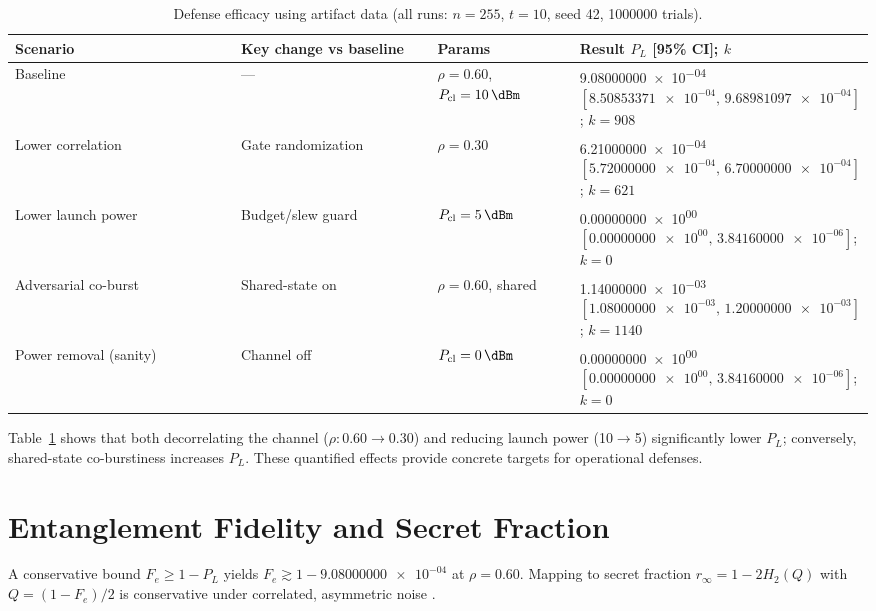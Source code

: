 \documentclass{article}
\newcommand{\val}[1]{\num[round-mode=figures,round-precision=3]{#1}}
\newcommand{\simpcl}{10}
\newcommand{\simn}{255}
\newcommand{\simt}{10}
\newcommand{\simtrials}{1000000}
\newcommand{\simseed}{42}
\newcommand{\simrhoB}{0.60}
\newcommand{\simpLB}{9.08000000e-04}
\newcommand{\simpLBlo}{8.50853371e-04}
\newcommand{\simpLBhi}{9.68981097e-04}
\newcommand{\simkB}{908}
\newcommand{\simrhoA}{0.30}
\newcommand{\simpLA}{6.21000000e-04}
\newcommand{\simpLAlo}{5.72000000e-04}
\newcommand{\simpLAhi}{6.70000000e-04}
\newcommand{\simkA}{621}
\newcommand{\simpclA}{0}
\newcommand{\simpLPclA}{0.00000000e+00}
\newcommand{\simpLPclAlo}{0.00000000e+00}
\newcommand{\simpLPclAhi}{3.84160000e-06}
\newcommand{\simkPclA}{0}
\newcommand{\simpclB}{5}
\newcommand{\simpLPclB}{0.00000000e+00}
\newcommand{\simpLPclBlo}{0.00000000e+00}
\newcommand{\simpLPclBhi}{3.84160000e-06}
\newcommand{\simkPclB}{0}
\newcommand{\simSharedPL}{1.14000000e-03}
\newcommand{\simSharedPLlo}{1.08000000e-03}
\newcommand{\simSharedPLhi}{1.20000000e-03}
\newcommand{\simSharedk}{1140}
\begin{document}
\begin{table}[ht]
\small
\centering
\caption{Defense efficacy using artifact data (all runs: \(n=\simn\), \(t=\simt\), seed \simseed, \simtrials{} trials).}
\label{tab:defense-efficacy}
\begin{adjustbox}{width=\linewidth}
\begin{tabular}{p{0.31\linewidth} p{0.26\linewidth} p{0.18\linewidth} p{0.25\linewidth}}
\toprule
Scenario & Key change vs baseline & Params & Result \(P_L\) [95\% CI]; \(k\) \\
\midrule
Baseline & --- & \(\rho=\simrhoB\), \(P_{\mathrm{cl}}=\SI{\simpcl}{\dBm}\) & \num{\simpLB} \([\num{\simpLBlo},\,\num{\simpLBhi}]\); \(k=\simkB\) \\
Lower correlation & Gate randomization & \(\rho=\simrhoA\) & \num{\simpLA} \([\num{\simpLAlo},\,\num{\simpLAhi}]\); \(k=\simkA\) \\
Lower launch power & Budget/slew guard & \(P_{\mathrm{cl}}=\SI{\simpclB}{\dBm}\) & \num{\simpLPclB} \([\num{\simpLPclBlo},\,\num{\simpLPclBhi}]\); \(k=\simkPclB\) \\
Adversarial co-burst & Shared-state on & \(\rho=\simrhoB\), shared & \num{\simSharedPL} \([\num{\simSharedPLlo},\,\num{\simSharedPLhi}]\); \(k=\simSharedk\) \\
Power removal (sanity) & Channel off & \(P_{\mathrm{cl}}=\SI{\simpclA}{\dBm}\) & \num{\simpLPclA} \([\num{\simpLPclAlo},\,\num{\simpLPclAhi}]\); \(k=\simkPclA\) \\
\bottomrule
\end{tabular}
\end{adjustbox}
\vspace{0.5em}
\end{table}

Table~\ref{tab:defense-efficacy} shows that both decorrelating the channel (\(\rho:0.60\!\to\!0.30\)) and reducing launch power (\SI{10}{\dBm}\(\to\)\SI{5}{\dBm}) significantly lower \(P_L\); conversely, shared-state co-burstiness increases \(P_L\). These quantified effects provide concrete targets for operational defenses.

\section{Entanglement Fidelity and Secret Fraction}
A conservative bound \(F_e \ge 1-P_L\) yields \(F_e \gtrsim 1-\val{\simpLB}\) at \(\rho=\simrhoB\). Mapping to secret fraction \(r_\infty=1-2H_2(Q)\) with \(Q=(1-F_e)/2\) is conservative under correlated, asymmetric noise \cite{DevetakWinter2005PRSA,Pirandola2020AOP}.
\end{document}
